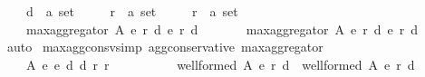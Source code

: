 \begin{isabellebody}
\ \ \ \ d{}\ {\isacharcolon}{\kern0pt}{\isacharcolon}{\kern0pt}\ {\isachardoublequoteopen}{\isacharprime}{\kern0pt}a\ set{\isachardoublequoteclose}\ \isanewline
\ \ \ \ r{}\ {\isacharcolon}{\kern0pt}{\isacharcolon}{\kern0pt}\ {\isachardoublequoteopen}{\isacharprime}{\kern0pt}a\ set{\isachardoublequoteclose}\ \isanewline
\ \ \ \ r{}\ {\isacharcolon}{\kern0pt}{\isacharcolon}{\kern0pt}\ {\isachardoublequoteopen}{\isacharprime}{\kern0pt}a\ set{\isachardoublequoteclose}\isanewline
\ \ \isamarkupfalse%
\isanewline
\ \ \ \ {\isachardoublequoteopen}max{\isacharunderscore}{\kern0pt}aggregator\ A\ {\isacharparenleft}{\kern0pt}e{}{\isacharcomma}{\kern0pt}\ r{}{\isacharcomma}{\kern0pt}\ d{}{\isacharparenright}{\kern0pt}\ {\isacharparenleft}{\kern0pt}e{}{\isacharcomma}{\kern0pt}\ r{}{\isacharcomma}{\kern0pt}\ d{}{\isacharparenright}{\kern0pt}\ {\isacharequal}{\kern0pt}\isanewline
\ \ \ \ \ \ max{\isacharunderscore}{\kern0pt}aggregator\ A\ {\isacharparenleft}{\kern0pt}e{}{\isacharcomma}{\kern0pt}\ r{}{\isacharcomma}{\kern0pt}\ d{}{\isacharparenright}{\kern0pt}\ {\isacharparenleft}{\kern0pt}e{}{\isacharcomma}{\kern0pt}\ r{}{\isacharcomma}{\kern0pt}\ d{}{\isacharparenright}{\kern0pt}{\isachardoublequoteclose}\isanewline
\ \ \isamarkupfalse%
\ auto\isanewline
{}\isamarkupfalse%
%
\endisatagproof
{\isafoldproof}%
%
\isadelimproof
\isanewline
%
\endisadelimproof
\isanewline
\isanewline
\isanewline
{}\isamarkupfalse%
\ max{\isacharunderscore}{\kern0pt}agg{\isacharunderscore}{\kern0pt}consv{\isacharbrackleft}{\kern0pt}simp{\isacharbrackright}{\kern0pt}{\isacharcolon}{\kern0pt}\ {\isachardoublequoteopen}agg{\isacharunderscore}{\kern0pt}conservative\ max{\isacharunderscore}{\kern0pt}aggregator{\isachardoublequoteclose}\isanewline
%
\isadelimproof
%
\endisadelimproof
%
\isatagproof
{}\isamarkupfalse%
\ {\isacharminus}{\kern0pt}\isanewline
\ \ \isamarkupfalse%
\isanewline
\ \ \ \ {\isachardoublequoteopen}{\isasymforall}A\ e{}\ e{}\ d{}\ d{}\ r{}\ r{}{\isachardot}{\kern0pt}\isanewline
\ \ \ \ \ \ \ \ \ \ {\isacharparenleft}{\kern0pt}well{\isacharunderscore}{\kern0pt}formed\ A\ {\isacharparenleft}{\kern0pt}e{}{\isacharcomma}{\kern0pt}\ r{}{\isacharcomma}{\kern0pt}\ d{}{\isacharparenright}{\kern0pt}\ {\isasymand}\ well{\isacharunderscore}{\kern0pt}formed\ A\ {\isacharparenleft}{\kern0pt}e{}{\isacharcomma}{\kern0pt}\ r{}{\isacharcomma}{\kern0pt}\ d{}{\isacharparenright}{\kern0pt}{\isacharparenright}{\kern0pt}\ {\isasymlongrightarrow}\isanewline

\end{isabellebody}

